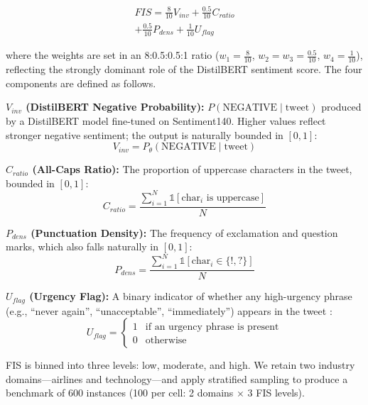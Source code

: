 \documentclass[11pt]{article}
\begin{document}
\begin{multline}
    FIS = \tfrac{8}{10}V_{inv} + \tfrac{0.5}{10}C_{ratio} \\
          + \tfrac{0.5}{10}P_{dens} + \tfrac{1}{10}U_{flag}
\end{multline}

\noindent where the weights are set in an 8:0.5:0.5:1 ratio ($w_1 = \tfrac{8}{10}$, $w_2 = w_3 = \tfrac{0.5}{10}$, $w_4 = \tfrac{1}{10}$), reflecting the strongly dominant role of the DistilBERT sentiment score. The four components are defined as follows.

\textbf{$V_{inv}$ (DistilBERT Negative Probability):} $P(\text{NEGATIVE} \mid \text{tweet})$ produced by a DistilBERT model fine-tuned on Sentiment140. Higher values reflect stronger negative sentiment; the output is naturally bounded in $[0,1]$:
\begin{equation}
    V_{inv} = P_{\theta}(\text{NEGATIVE} \mid \text{tweet})
\end{equation}

\textbf{$C_{ratio}$ (All-Caps Ratio):} The proportion of uppercase characters in the tweet, bounded in $[0,1]$:
\begin{equation}
    C_{ratio} = \frac{\displaystyle\sum_{i=1}^{N} \mathbb{1}[\text{char}_i \text{ is uppercase}]}{N}
\end{equation}

\textbf{$P_{dens}$ (Punctuation Density):} The frequency of exclamation and question marks, which also falls naturally in $[0,1]$:
\begin{equation}
    P_{dens} = \frac{\displaystyle\sum_{i=1}^{N} \mathbb{1}[\text{char}_i \in \{!, ?\}]}{N}
\end{equation}

\textbf{$U_{flag}$ (Urgency Flag):} A binary indicator of whether any high-urgency phrase (e.g., ``never again'', ``unacceptable'', ``immediately'') appears in the tweet \cite{kejriwal2020urgency}:
\begin{equation}
    U_{flag} = \begin{cases} 1 & \text{if an urgency phrase is present} \\ 0 & \text{otherwise} \end{cases}
\end{equation}

FIS is binned into three levels: low, moderate, and high. We retain two industry domains---airlines and technology---and apply stratified sampling to produce a benchmark of 600 instances (100 per cell: 2 domains $\times$ 3 FIS levels).
\end{document}
